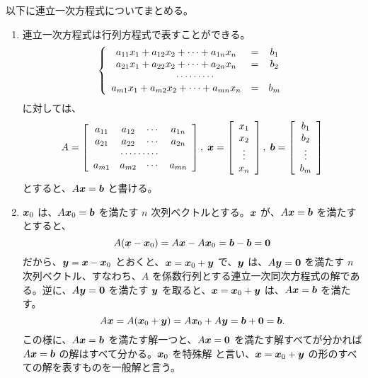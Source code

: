 \medskip
以下に連立一次方程式についてまとめる。

\begin{enumerate}
\item 連立一次方程式は行列方程式で表すことができる。
$$\left\{\begin{array}{ccc}
a_{11}x_1 + a_{12}x_2 + \cdots + a_{1n}x_n & = & b_1\\
a_{21}x_1 + a_{22}x_2 + \cdots + a_{2n}x_n & = & b_2\\
\multicolumn{3}{c}{\cdots\cdots\cdots} \\
a_{m1}x_1 + a_{m2}x_2 + \cdots + a_{mn}x_n & = & b_m
\end{array}\right.$$
に対しては、
$$A = \left[\begin{array}{cccc}
a_{11} & a_{12} & \cdots & a_{1n}\\
a_{21} & a_{22} & \cdots & a_{2n} \\
\multicolumn{4}{c}{\cdots\cdots\cdots}\\
a_{m1} & a_{m2} & \cdots & a_{mn}
\end{array}
\right],\;\bx = \left[\begin{array}{c}
x_1\\
x_2\\
\vdots\\
x_n
\end{array}
\right],\;\bb = \left[\begin{array}{c}
b_1\\
b_2\\
\vdots\\
b_m
\end{array}
\right]$$
とすると、$A\bx = \bb$ と書ける。

\item $\bx_0$ は、$A\bx_0 = \bb$ を満たす $n$ 次列ベクトルとする。$\bx$ が、$A\bx = \bb$ を満たすとすると、
$$A(\bx - \bx_0) = A\bx - A\bx_0 = \bb - \bb = \bo$$
だから、$\by = \bx - \bx_0$ とおくと、$\bx = \bx_0 + \by$ で、$\by$ は、$A\by = \bo$ を満たす $n$ 次列ベクトル、すなわち、$A$ を係数行列とする連立一次同次方程式の解である。逆に、$A\by = \bo$ を満たす $\by$ を取ると、$\bx = \bx_0 + \by$ は、$A\bx = \bb$ を満たす。
$$A\bx = A(\bx_0 + \by) = A\bx_0 + A\by = \bb + \bo = \bb.$$
この様に、$A\bx = \bb$ を満たす解一つと、$A\bx = \bo$ を満たす解すべてが分かれば $A\bx = \bb$ の解はすべて分かる。$\bx_0$ を{\gt 特殊解} と言い、$\bx = \bx_0 + \by$ の形のすべての解を表すものを{\gt 一般解}と言う。


\end{enumerate}
